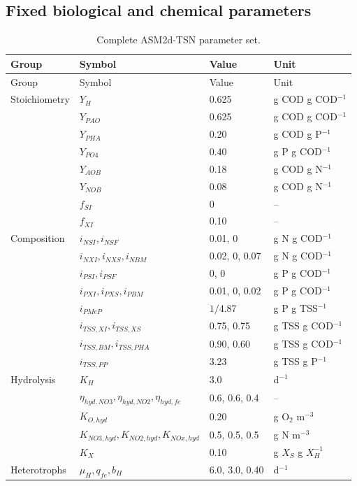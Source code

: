 \documentclass[a4paper,fleqn]{cas-sc}
\begin{document}
\subsection{Fixed biological and chemical parameters}

\begin{longtable}{llll}
\caption{Complete ASM2d-TSN parameter set.}\label{tab:complete_asm_parameters}\\
\toprule
Group & Symbol & Value & Unit \\
\midrule
\endfirsthead
\toprule
Group & Symbol & Value & Unit \\
\midrule
\endhead
Stoichiometry & $Y_H$ & 0.625 & g COD g COD$^{-1}$ \\
 & $Y_{PAO}$ & 0.625 & g COD g COD$^{-1}$ \\
 & $Y_{PHA}$ & 0.20 & g COD g P$^{-1}$ \\
 & $Y_{PO4}$ & 0.40 & g P g COD$^{-1}$ \\
 & $Y_{AOB}$ & 0.18 & g COD g N$^{-1}$ \\
 & $Y_{NOB}$ & 0.08 & g COD g N$^{-1}$ \\
 & $f_{SI}$ & 0 & -- \\
 & $f_{XI}$ & 0.10 & -- \\
Composition & $i_{NSI},i_{NSF}$ & 0.01, 0 & g N g COD$^{-1}$ \\
 & $i_{NXI},i_{NXS},i_{NBM}$ & 0.02, 0, 0.07 & g N g COD$^{-1}$ \\
 & $i_{PSI},i_{PSF}$ & 0, 0 & g P g COD$^{-1}$ \\
 & $i_{PXI},i_{PXS},i_{PBM}$ & 0.01, 0, 0.02 & g P g COD$^{-1}$ \\
 & $i_{PMeP}$ & $1/4.87$ & g P g TSS$^{-1}$ \\
 & $i_{TSS,XI},i_{TSS,XS}$ & 0.75, 0.75 & g TSS g COD$^{-1}$ \\
 & $i_{TSS,BM},i_{TSS,PHA}$ & 0.90, 0.60 & g TSS g COD$^{-1}$ \\
 & $i_{TSS,PP}$ & 3.23 & g TSS g P$^{-1}$ \\
Hydrolysis & $K_H$ & 3.0 & d$^{-1}$ \\
 & $\eta_{hyd,NO3},\eta_{hyd,NO2},\eta_{hyd,fe}$ & 0.6, 0.6, 0.4 & -- \\
 & $K_{O,hyd}$ & 0.20 & g O$_2$ m$^{-3}$ \\
 & $K_{NO3,hyd},K_{NO2,hyd},K_{NOx,hyd}$ & 0.5, 0.5, 0.5 & g N m$^{-3}$ \\
 & $K_X$ & 0.10 & g $X_S$ g $X_H^{-1}$ \\
Heterotrophs & $\mu_H,q_{fe},b_H$ & 6.0, 3.0, 0.40 & d$^{-1}$ \\

\end{longtable}
\end{document}
